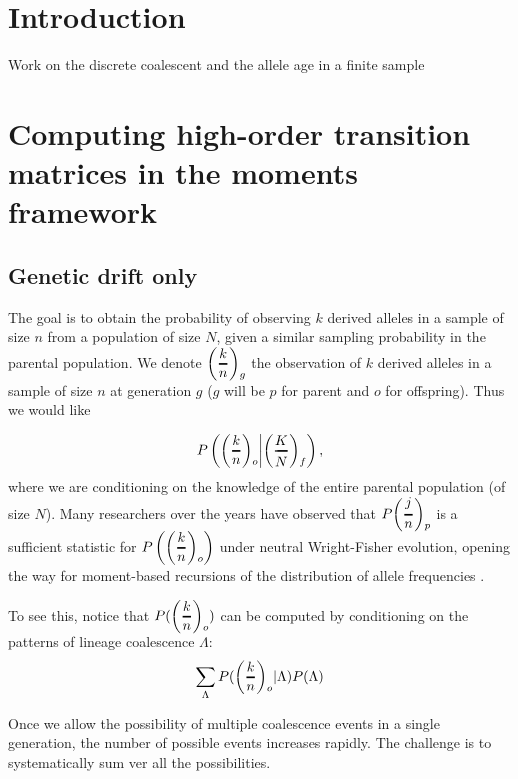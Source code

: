\documentclass[]{article}
\newcommand{\Dfrac}[2]{%
  \ooalign{%
    $\left(\genfrac{}{}{1.2pt}0{#1}{#2}\right)$\cr%
    $\color{white}\genfrac{}{}{.4pt}0{\phantom{#1}}{\phantom{#2}}$}%
}
\begin{document}
\section{Introduction}
\label{sec:intro}

Work on the discrete coalescent and the allele age in a finite sample
\section{Computing high-order transition matrices in the moments framework}
\subsection{Genetic drift only}
The goal is to obtain the probability of observing $k$ derived alleles in a sample of size $n$ from a population of size $N$, given a similar sampling probability in the parental population. We denote $\Dfrac{k}{n}_g$ the observation of $k$ derived alleles in a sample of size $n$ at generation $g$ ($g$ will be $p$ for parent and $o$ for offspring).  Thus we would like 

$$P\left(\Dfrac{k}{n}_o \middle|  \Dfrac{K}{N}_f \right),$$ where we are conditioning on the knowledge of the entire parental population (of size $N$). Many researchers over the years have observed that $P\Dfrac{j}{n}_p$ is a sufficient statistic for  $P\left(\Dfrac{k}{n}_o\right)$ under neutral Wright-Fisher evolution, opening the way for moment-based recursions of the distribution of allele frequencies \cite{Kimura, Ewens, Song, Jouganous, Kurtz-Donnely}.

To see this, notice that $P(\Dfrac{k}{n}_o)$ can be computed by conditioning on the patterns of lineage coalescence $\Lambda$:
$$\sum_\Lambda P(\Dfrac{k}{n}_o | \Lambda) P(\Lambda)$$





 

Once we allow the possibility of multiple coalescence events in a single generation, the number of possible events increases rapidly. The challenge is to systematically sum ver all the possibilities. 
\end{document}
